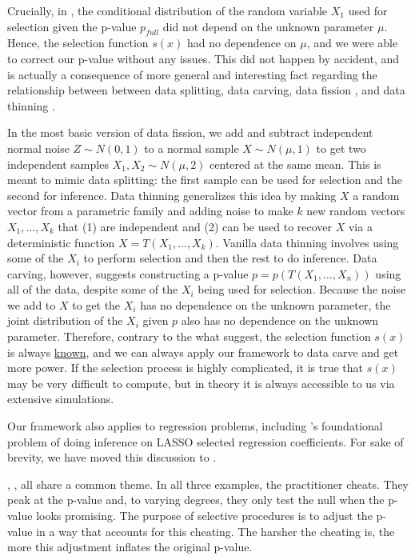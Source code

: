 \documentclass{article}
\begin{document}
Crucially, in , the conditional distribution of the random variable $X_1$ used for selection given the p-value $p_{full}$ did not depend on the unknown parameter $\mu$. Hence, the selection function $s(x)$ had no dependence on $\mu$, and we were able to correct our p-value without any issues. This did not happen by accident, and is actually a consequence of more general and interesting fact regarding the relationship between between data splitting, data carving, data fission \citep{Leiner}, and data thinning \citep{Dharamshi, Neufeld}.

In the most basic version of data fission, we add and subtract independent normal noise $Z \sim N(0, 1)$ to a normal sample $X \sim N(\mu, 1)$ to get two independent samples $X_1, X_2 \sim N(\mu, 2)$ centered at the same mean. This is meant to mimic data splitting: the first sample can be used for selection and the second for inference. Data thinning generalizes this idea by making $X$ a random vector from a parametric family and adding noise to make $k$ new random vectors $X_1, \dots, X_k$ that (1) are independent and (2) can be used to recover $X$ via a deterministic function $X = T(X_1, \dots, X_k)$. Vanilla data thinning involves using some of the $X_i$ to perform selection and then the rest to do inference. Data carving, however, suggests constructing a p-value $p = p(T(X_1, \dots, X_n))$ using all of the data, despite some of the $X_i$ being used for selection. Because the noise we add to $X$ to get the $X_i$ has no dependence on the unknown parameter, the joint distribution of the $X_i$ given $p$ also has no dependence on the unknown parameter. Therefore, contrary to the what \cite{Leiner} suggest, the selection function $s(x)$ is always \underline{known}, and we can always apply our framework to data carve and get more power. If the selection process is highly complicated, it is true that $s(x)$ may be very difficult to compute, but in theory it is always accessible to us via extensive simulations. 

Our framework also applies to regression problems, including \cite{Lee}'s foundational problem of doing inference on LASSO selected regression coefficients. For sake of brevity, we have moved this discussion to .  

, ,  all share a common theme. In all three examples, the practitioner cheats. They peak at the p-value and, to varying degrees, they only test the null when the p-value looks promising. The purpose of selective procedures is to adjust the p-value in a way that accounts for this cheating. The harsher the cheating is, the more this adjustment inflates the original p-value. 
\end{document}
